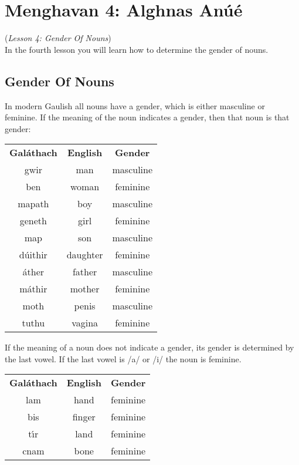 \section{Menghavan 4: Alghnas An\'{u}\'{e}}
(\textit{Lesson 4: Gender Of Nouns})\\

In the fourth lesson you will learn how to determine the gender of nouns.

\subsection{Gender Of Nouns}

In modern Gaulish all nouns have a gender, which is either masculine or feminine. If the meaning of the noun indicates a gender, then that noun is that gender:
\begin{table}[H]
\centering
\begin{tabular}{ccc}
  \toprule
  \textbf{Gal\'{a}thach} & \textbf{English} & \textbf{Gender}\\
  \cmidrule(lr){1-1}\cmidrule(lr){2-2}\cmidrule(lr){3-3}
  gwir & man & masculine\\
  ben & woman & feminine\\
  mapath & boy & masculine\\
  geneth & girl & feminine\\
  map & son & masculine\\
  d\'{u}ithir & daughter & feminine\\
  \'{a}ther & father & masculine\\
  m\'{a}thir & mother & feminine\\
  moth & penis & masculine\\
  tuthu & vagina & feminine\\
  \bottomrule
\end{tabular}
\label{example_gender_meaning}
\end{table}

If the meaning of a noun does not indicate a gender, its gender is determined by the last vowel. If the last vowel is /a/ or /i/ the noun is feminine.
\begin{table}[H]
\centering
\begin{tabular}{ccc}
  \toprule
  \textbf{Gal\'{a}thach} & \textbf{English} & \textbf{Gender}\\
  \cmidrule(lr){1-1}\cmidrule(lr){2-2}\cmidrule(lr){3-3}
  lam & hand & feminine\\
  bis & finger & feminine\\
  t\'{\i}r & land & feminine\\
  cnam & bone & feminine\\
  \bottomrule
\end{tabular}
\label{example_gender_last_vowel_ai}
\end{table}

